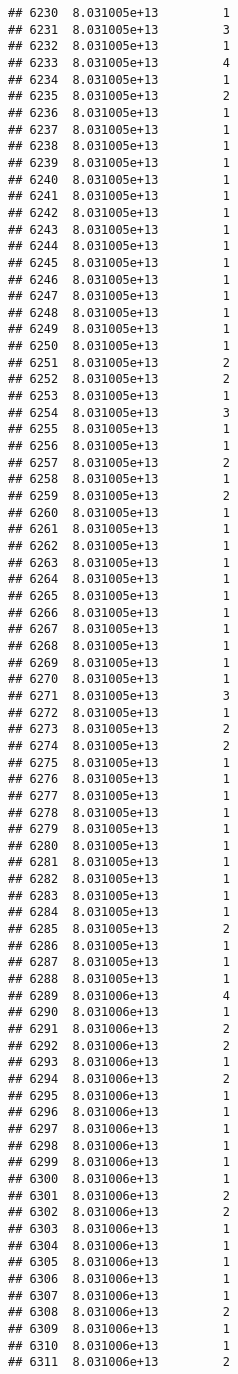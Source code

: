\documentclass[
]{article}
\begin{document}
\begin{verbatim}
## 6230  8.031005e+13         1
## 6231  8.031005e+13         3
## 6232  8.031005e+13         1
## 6233  8.031005e+13         4
## 6234  8.031005e+13         1
## 6235  8.031005e+13         2
## 6236  8.031005e+13         1
## 6237  8.031005e+13         1
## 6238  8.031005e+13         1
## 6239  8.031005e+13         1
## 6240  8.031005e+13         1
## 6241  8.031005e+13         1
## 6242  8.031005e+13         1
## 6243  8.031005e+13         1
## 6244  8.031005e+13         1
## 6245  8.031005e+13         1
## 6246  8.031005e+13         1
## 6247  8.031005e+13         1
## 6248  8.031005e+13         1
## 6249  8.031005e+13         1
## 6250  8.031005e+13         1
## 6251  8.031005e+13         2
## 6252  8.031005e+13         2
## 6253  8.031005e+13         1
## 6254  8.031005e+13         3
## 6255  8.031005e+13         1
## 6256  8.031005e+13         1
## 6257  8.031005e+13         2
## 6258  8.031005e+13         1
## 6259  8.031005e+13         2
## 6260  8.031005e+13         1
## 6261  8.031005e+13         1
## 6262  8.031005e+13         1
## 6263  8.031005e+13         1
## 6264  8.031005e+13         1
## 6265  8.031005e+13         1
## 6266  8.031005e+13         1
## 6267  8.031005e+13         1
## 6268  8.031005e+13         1
## 6269  8.031005e+13         1
## 6270  8.031005e+13         1
## 6271  8.031005e+13         3
## 6272  8.031005e+13         1
## 6273  8.031005e+13         2
## 6274  8.031005e+13         2
## 6275  8.031005e+13         1
## 6276  8.031005e+13         1
## 6277  8.031005e+13         1
## 6278  8.031005e+13         1
## 6279  8.031005e+13         1
## 6280  8.031005e+13         1
## 6281  8.031005e+13         1
## 6282  8.031005e+13         1
## 6283  8.031005e+13         1
## 6284  8.031005e+13         1
## 6285  8.031005e+13         2
## 6286  8.031005e+13         1
## 6287  8.031005e+13         1
## 6288  8.031005e+13         1
## 6289  8.031006e+13         4
## 6290  8.031006e+13         1
## 6291  8.031006e+13         2
## 6292  8.031006e+13         2
## 6293  8.031006e+13         1
## 6294  8.031006e+13         2
## 6295  8.031006e+13         1
## 6296  8.031006e+13         1
## 6297  8.031006e+13         1
## 6298  8.031006e+13         1
## 6299  8.031006e+13         1
## 6300  8.031006e+13         1
## 6301  8.031006e+13         2
## 6302  8.031006e+13         2
## 6303  8.031006e+13         1
## 6304  8.031006e+13         1
## 6305  8.031006e+13         1
## 6306  8.031006e+13         1
## 6307  8.031006e+13         1
## 6308  8.031006e+13         2
## 6309  8.031006e+13         1
## 6310  8.031006e+13         1
## 6311  8.031006e+13         2

\end{verbatim}
\end{document}
